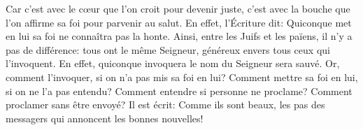 Car c’est avec le cœur que l’on croit pour devenir juste,
	c’est avec la bouche que l’on affirme sa foi pour parvenir au salut.
En effet, l’Écriture dit: Quiconque met en lui sa foi ne connaîtra pas la honte.
Ainsi, entre les Juifs et les païens, il n’y a pas de différence:
	tous ont le même Seigneur, généreux envers tous ceux qui l’invoquent.
En effet, quiconque invoquera le nom du Seigneur sera sauvé.
Or, comment l’invoquer, si on n’a pas mis sa foi en lui?
Comment mettre sa foi en lui, si on ne l’a pas entendu?
Comment entendre si personne ne proclame?
Comment proclamer sans être envoyé?
Il est écrit:
	Comme ils sont beaux, les pas des messagers qui annoncent les bonnes nouvelles!
